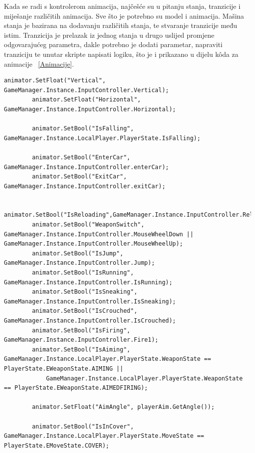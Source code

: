 Kada se radi s kontrolerom animacija, najčešće su u pitanju stanja, tranzicije i miješanje različitih animacija. Sve što je potrebno su model i animacija. Mašina stanja je bazirana na dodavanju različitih stanja, te stvaranje tranzicije među istim. Tranzicija je prelazak iz jednog stanja u drugo uslijed promjene odgovarajućeg parametra, dakle potrebno je dodati parametar, napraviti tranziciju te unutar skripte napisati logiku, što je i prikazano u dijelu k\^oda za animacije ~\ref{Animacije}.

\begin{lstlisting}[caption={Skripta animacija}, label=Animacije]
animator.SetFloat("Vertical", GameManager.Instance.InputController.Vertical);
        animator.SetFloat("Horizontal", GameManager.Instance.InputController.Horizontal);

        animator.SetBool("IsFalling", GameManager.Instance.LocalPlayer.PlayerState.IsFalling);

        animator.SetBool("EnterCar", GameManager.Instance.InputController.enterCar);
        animator.SetBool("ExitCar", GameManager.Instance.InputController.exitCar);

        animator.SetBool("IsReloading",GameManager.Instance.InputController.Reload);
        animator.SetBool("WeaponSwitch", GameManager.Instance.InputController.MouseWheelDown || GameManager.Instance.InputController.MouseWheelUp);
        animator.SetBool("IsJump", GameManager.Instance.InputController.Jump);
        animator.SetBool("IsRunning", GameManager.Instance.InputController.IsRunning);
        animator.SetBool("IsSneaking", GameManager.Instance.InputController.IsSneaking);
        animator.SetBool("IsCrouched", GameManager.Instance.InputController.IsCrouched);
        animator.SetBool("IsFiring", GameManager.Instance.InputController.Fire1);
        animator.SetBool("IsAiming", GameManager.Instance.LocalPlayer.PlayerState.WeaponState == PlayerState.EWeaponState.AIMING ||
            GameManager.Instance.LocalPlayer.PlayerState.WeaponState == PlayerState.EWeaponState.AIMEDFIRING);

        animator.SetFloat("AimAngle", playerAim.GetAngle());

        animator.SetBool("IsInCover", GameManager.Instance.LocalPlayer.PlayerState.MoveState == PlayerState.EMoveState.COVER);

\end{lstlisting}

